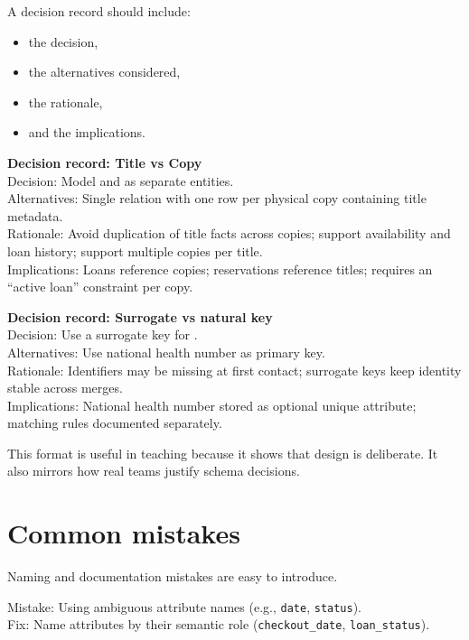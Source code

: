 A decision record should include:
\begin{itemize}[leftmargin=*,nosep]
  \item the decision,
  \item the alternatives considered,
  \item the rationale,
  \item and the implications.
\end{itemize}

\begin{examplebox}
\textbf{Decision record: Title vs Copy}\\[4pt]
Decision: Model  and  as separate entities.\\
Alternatives: Single relation with one row per physical copy containing title metadata.\\
Rationale: Avoid duplication of title facts across copies; support availability and loan history; support multiple copies per title.\\
Implications: Loans reference copies; reservations reference titles; requires an “active loan” constraint per copy.
\end{examplebox}

\begin{examplebox}
\textbf{Decision record: Surrogate vs natural key}\\[4pt]
Decision: Use a surrogate key for .\\
Alternatives: Use national health number as primary key.\\
Rationale: Identifiers may be missing at first contact; surrogate keys keep identity stable across merges.\\
Implications: National health number stored as optional unique attribute; matching rules documented separately.
\end{examplebox}

This format is useful in teaching because it shows that design is deliberate.
It also mirrors how real teams justify schema decisions.

\section{Common mistakes}
Naming and documentation mistakes are easy to introduce.

Mistake: Using ambiguous attribute names (e.g., \texttt{date}, \texttt{status}).\\
Fix: Name attributes by their semantic role (\texttt{checkout\_date}, \texttt{loan\_status}).

